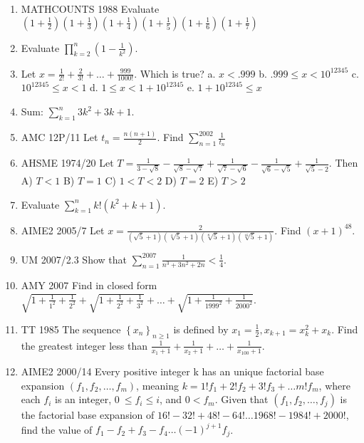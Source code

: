 \documentclass{article}
\begin{document}
\begin{enumerate}

\item MATHCOUNTS 1988 Evaluate $(1+\frac{1}{2})(1+\frac{1}{3})(1+\frac{1}{4})(1+\frac{1}{5})(1+\frac{1}{6})(1+\frac{1}{7})$
\item Evaluate $\prod_{k=2}^{n} (1-\frac{1}{k^2})$.
\item Let $x=\frac{1}{2!}+\frac{2}{3!}+ \ldots +\frac{999}{1000!}$. Which is true? a. $x<.999$ b. $.999 \leq x < 10^{12345}$ c. $10^{12345} \leq x < 1$ d. $1 \leq x < 1+10^{12345}$ e. $1+10^{12345} \leq x$
\item Sum: $\sum_{k=1}^{n} 3k^2 +3k +1$.
\item AMC 12P/11 Let $t_n=\frac{n(n+1)}{2}$. Find $\sum_{n=1}^{2002} \frac{1}{t_n}$
\item AHSME 1974/20 Let $T=\frac{1}{3-\sqrt{8}} - \frac{1}{\sqrt{8}-\sqrt{7}} + \frac{1}{\sqrt{7}-\sqrt{6}} - \frac{1}{\sqrt{6}- \sqrt{5}} + \frac{1}{\sqrt{5}-2}$. Then A) $T<1$ B) $T=1$ C) $1<T<2$ D) $T=2$ E) $T>2$
\item Evaluate $\sum_{k=1}^{n} k!(k^2+k+1)$.
\item AIME2 2005/7 Let $x=\frac{2}{(\sqrt{5}+1)(\sqrt[4]{5}+1)(\sqrt[8]{5}+1)(\sqrt[16]{5} +1)}$. Find $(x+1)^{48}$.
\item UM 2007/2.3 Show that $\sum_{n=1}^{2007} \frac{1}{n^3+3n^2+2n} < \frac{1}{4}$.
\item AMY 2007 Find in closed form $\sqrt{1+\frac{1}{1^2}+\frac{1}{2^2}}+\sqrt{1+\frac{1}{2^2}+\frac{1}{3^2}}+ \ldots + \sqrt{1+\frac{1}{1999^2}+\frac{1}{2000^2}}$.
\item TT 1985 The sequence $\left\{x_n\right\}_{n \geq 1}$ is defined by $x_1=\frac{1}{2}, x_{k+1}=x_k^2+x_k$. Find the greatest integer less than $\frac{1}{x_1+1} + \frac{1}{x_2+1} + \ldots + \frac{1}{x_{100}+1}$.
\item AIME2 2000/14 Every positive integer k has an unique factorial base expansion $(f_1,f_2,\ldots ,f_m)$, meaning $k=1!f_1+2!f_2+3!f_3+\ldots m!f_m$, where each $f_i$ is an integer, $0\ \leq f_i \leq i$, and $0 < f_m$. Given that $(f_1,f_2,\ldots ,f_j)$ is the factorial base expansion of $16!-32!+48!-64!\ldots 1968!-1984!+2000!$, find the value of $f_1 -f_2+ f_3-f_4 \ldots (-1)^{j+1}f_j$.
\end{enumerate}
\end{document}
